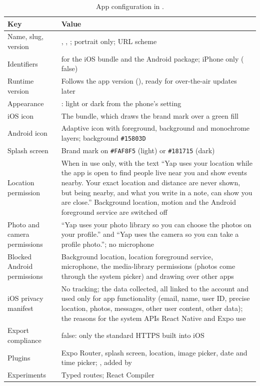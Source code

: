 \begin{table}[ht]
  \centering
  \caption{App configuration in .}
  \label{tab:app-json}
  \tablefont
  \begin{tabularx}{\textwidth}{@{}L{44mm}Y@{}}
    \toprule
    \textsf{\textbf{Key}} & \textsf{\textbf{Value}} \\
    \midrule
    Name, slug, version & , , ; portrait only; URL scheme  \\
    Identifiers &  for the iOS bundle and the Android package; iPhone only ( false) \\
    Runtime version & Follows the app version (), ready for over-the-air updates later \\
    Appearance & : light or dark from the phone's setting \\
    iOS icon & The  bundle, which draws the brand mark over a green fill \\
    Android icon & Adaptive icon with foreground, background and monochrome layers; background \texttt{\#15803D} \\
    Splash screen & Brand mark on \texttt{\#FAF8F5} (light) or \texttt{\#181715} (dark) \\
    Location permission & When in use only, with the text ``Yap uses your location while the app is open to find people live near you and show events nearby. Your exact location and distance are never shown, but being nearby, and what you write in a note, can show you are close.'' Background location, motion and the Android foreground service are switched off \\
    Photo and camera permissions & ``Yap uses your photo library so you can choose the photos on your profile.'' and ``Yap uses the camera so you can take a profile photo.''; no microphone \\
    Blocked Android permissions & Background location, location foreground service, microphone, the media-library permissions (photos come through the system picker) and drawing over other apps \\
    iOS privacy manifest & No tracking; the data collected, all linked to the account and used only for app functionality (email, name, user ID, precise location, photos, messages, other user content, other data); the reasons for the system APIs React Native and Expo use \\
    Export compliance &  false: only the standard HTTPS built into iOS \\
    Plugins & Expo Router, splash screen, location, image picker, date and time picker; , added by  \\
    Experiments & Typed routes; React Compiler \\
    \bottomrule
  \end{tabularx}
\end{table}

